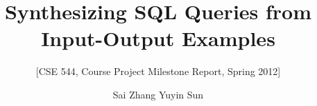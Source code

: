 \documentclass{sig-alternate}
\begin{document}
\title{Synthesizing SQL Queries from Input-Output Examples}
\subtitle{[CSE 544, Course Project Milestone Report, Spring 2012]}


\author{
\alignauthor Sai Zhang \quad Yuyin Sun\\
}


\maketitle




















\vspace{2mm}



\small{

}
\end{document}
